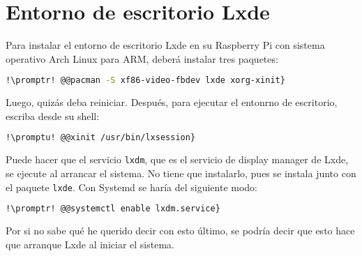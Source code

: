 \section{Entorno de escritorio Lxde}\label{sec:rasp-lxde}
Para instalar el entorno de escritorio Lxde en su Raspberry Pi con sistema operativo Arch Linux para ARM, deberá
instalar tres paquetes:

\begin{lstlisting}[gobble=2,language=bash,style=bashinteract,escapechar=!]
  !\promptr! @@pacman -S xf86-video-fbdev lxde xorg-xinit}
\end{lstlisting}

\noindent Luego, quizás deba reiniciar. Después, para ejecutar el entonrno de escritorio, escriba desde su
shell:

\begin{lstlisting}[gobble=2,language=bash,style=bashinteract,escapechar=!]
  !\promptu! @@xinit /usr/bin/lxsession}
\end{lstlisting}

Puede hacer que el servicio \lstinline!lxdm!, que es el servicio de display manager de Lxde, se ejecute al
arrancar el sistema. No tiene que instalarlo, pues se instala junto con el paquete \lstinline!lxde!. Con Systemd
se haría del siguiente modo:

\begin{lstlisting}[gobble=2,language=bash,style=bashinteract,escapechar=!]
  !\promptr! @@systemctl enable lxdm.service}
\end{lstlisting}

\noindent Por si no sabe qué he querido decir con esto último, se podría decir que esto hace que arranque Lxde
al iniciar el sistema.
